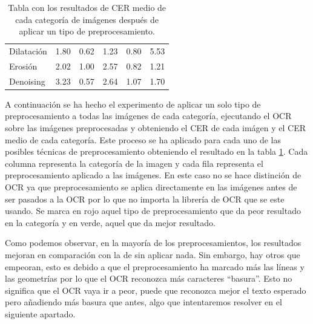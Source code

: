 \begin{enumerate}
\begin{table}[H]
\begin{tabular}{llllll}
			Dilatación                                                           & \cellcolor[HTML]{00FF00}1.80  & 0.62                         & \cellcolor[HTML]{00FF00}1.23  & 0.80                         & 5.53                          \\
			Erosión                                                              & 2.02                          & 1.00                         & 2.57                          & 0.82                         & 1.21                          \\
			Denoising                                                            & 3.23                          & 0.57                         & 2.64                          & 1.07                         & 1.70                         
		\end{tabular}
		\caption{Tabla con los resultados de CER medio de cada categoría de imágenes después de aplicar un tipo de preprocesamiento.}
		\label{table:preproCERtable}
	\end{table}
\end{enumerate}
A continuación se ha hecho el experimento de aplicar un solo tipo de preprocesamiento a todas las imágenes de cada categoría, ejecutando el OCR sobre las imágenes preprocesadas y obteniendo el CER de cada imágen y el CER medio de cada categoría. Este proceso se ha aplicado para cada uno de las posibles técnicas de preprocesamiento obteniendo el resultado en la tabla \ref{table:preproCERtable}. Cada columna representa la categoría de la imagen y cada fila representa el preprocesamiento aplicado a las imágenes. En este caso no se hace distinción de OCR ya que preprocesamiento se aplica directamente en las imágenes antes de ser pasados a la OCR por lo que no importa la librería de OCR que se este usando.
Se marca en rojo aquel tipo de preprocesamiento que da peor resultado en la categoría y en verde, aquel que da mejor resultado.


Como podemos observar, en la mayoría de los preprocesamientos, los resultados mejoran en comparación con la de sin aplicar nada. Sin embargo, hay otros que empeoran, esto es debido a que el preprocesamiento ha marcado más las líneas y las geometrías por lo que el OCR reconozca más caracteres ``basura''. Esto no significa que el OCR vaya ir a peor, puede que reconozca mejor el texto esperado pero añadiendo más basura que antes, algo que intentaremos resolver en el siguiente apartado. 

